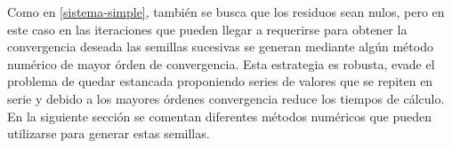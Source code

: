 Como en \ref{sistema-simple}, también se busca que los residuos sean nulos,
pero en este caso en las iteraciones que pueden llegar a requerirse para obtener la convergencia deseada
las semillas sucesivas se generan mediante algún método numérico de mayor órden de convergencia.
Esta estrategia es robusta, evade el problema de quedar estancada proponiendo series de valores que se repiten en serie y debido a los mayores órdenes convergencia reduce los tiempos de cálculo.
En la siguiente sección se comentan diferentes métodos numéricos que pueden utilizarse para generar estas semillas.


